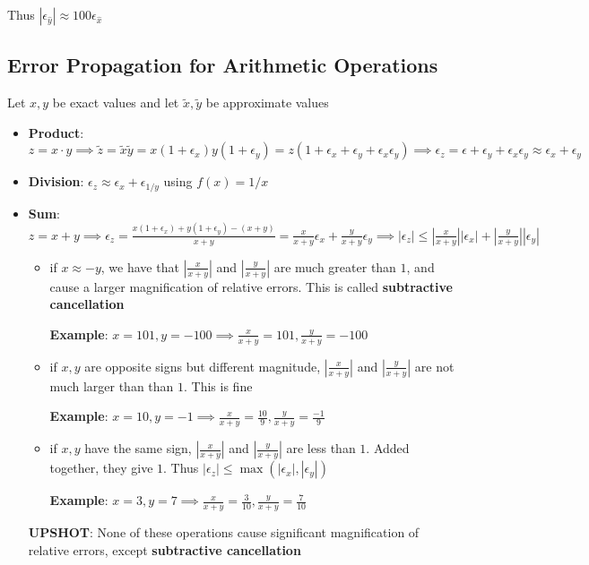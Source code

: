 \documentclass{article}
\begin{document}
  Thus $|\epsilon_{\hat{y}}| \approx 100 \epsilon_{\hat{x}}$

  \subsection{Error Propagation for Arithmetic Operations}

  Let $x, y$ be exact values and let $\tilde{x}, \tilde{y}$ be approximate values

  \begin{itemize}
  \item \textbf{Product}: $z = x \cdot y \implies \tilde{z} = \tilde{x} \tilde{y} = x(1 + \epsilon_x) y (1 + \epsilon_y) = z(1 + \epsilon_x + \epsilon_y + \epsilon_x \epsilon_y) \implies \epsilon_z = \epsilon + \epsilon_y + \epsilon_x \epsilon_y \approx \epsilon_x + \epsilon_y$
  \item \textbf{Division}: $\epsilon_z \approx \epsilon_x + \epsilon_{1/y}$ using $f(x) = 1/x$
  \item \textbf{Sum}: $z = x + y \implies \epsilon_z = \frac{x(1 + \epsilon_x) + y(1 + \epsilon_y) - (x + y)}{x+y} = \frac{x}{x + y} \epsilon_x + \frac{y}{x + y} \epsilon_y \implies |\epsilon_z| \leq \left| \frac{x}{x + y} \right| |\epsilon_x| + \left| \frac{y}{x + y} \right| |\epsilon_y|$
    \begin{itemize}
      \item if $x \approx -y$, we have that $\left| \frac{x}{x + y} \right|$ and $\left| \frac{y}{x + y} \right|$ are much greater than $1$, and cause a larger magnification of relative errors. This is called \textbf{subtractive cancellation}

        \textbf{Example}: $x = 101, y = - 100 \implies \frac{x}{x + y} = 101, \frac{y}{x + y} = -100$
      \item if $x, y$ are opposite signs but different magnitude, $\left| \frac{x}{x + y} \right|$ and $\left| \frac{y}{x + y} \right|$ are not much larger than than $1$. This is fine

        \textbf{Example}: $x = 10, y = -1 \implies \frac{x}{x+y} = \frac{10}{9}, \frac{y}{x+y} = \frac{-1}{9}$
      \item if $x, y$ have the same sign, $\left| \frac{x}{x + y} \right|$ and $\left| \frac{y}{x + y} \right|$ are less than $1$. Added together, they give $1$. Thus $|\epsilon_z| \leq \max(|\epsilon_x|, |\epsilon_y|)$

        \textbf{Example}: $x = 3, y = 7 \implies \frac{x}{x+ y} = \frac{3}{10}, \frac{y}{x + y} = \frac{7}{10}$

    \end{itemize}
  \textbf{UPSHOT}: None of these operations cause significant magnification of relative errors, except \textbf{subtractive cancellation}
  \end{itemize}
\end{document}
